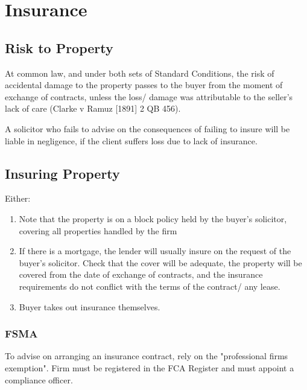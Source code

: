 \documentclass[
]{article}
\providecommand{\tightlist}{%
  \setlength{\itemsep}{0pt}\setlength{\parskip}{0pt}}
\begin{document}
\hypertarget{insurance-1}{%
\section{Insurance}\label{insurance-1}}

\hypertarget{risk-to-property}{%
\subsection{Risk to Property}\label{risk-to-property}}

At common law, and under both sets of Standard Conditions, the risk of
accidental damage to the property passes to the buyer from the moment of
exchange of contracts, unless the loss/ damage was attributable to the
seller's lack of care (Clarke v Ramuz {[}1891{]} 2 QB 456).

A solicitor who fails to advise on the consequences of failing to insure
will be liable in negligence, if the client suffers loss due to lack of
insurance.

\hypertarget{insuring-property}{%
\subsection{Insuring Property}\label{insuring-property}}

Either:

\begin{enumerate}
\tightlist
\item
  Note that the property is on a block policy held by the buyer's
  solicitor, covering all properties handled by the firm
\item
  If there is a mortgage, the lender will usually insure on the request
  of the buyer's solicitor. Check that the cover will be adequate, the
  property will be covered from the date of exchange of contracts, and
  the insurance requirements do not conflict with the terms of the
  contract/ any lease.
\item
  Buyer takes out insurance themselves.
\end{enumerate}

\hypertarget{fsma}{%
\subsubsection{FSMA}\label{fsma}}

To advise on arranging an insurance contract, rely on the "professional
firms exemption". Firm must be registered in the FCA Register and must
appoint a compliance officer.
\end{document}
